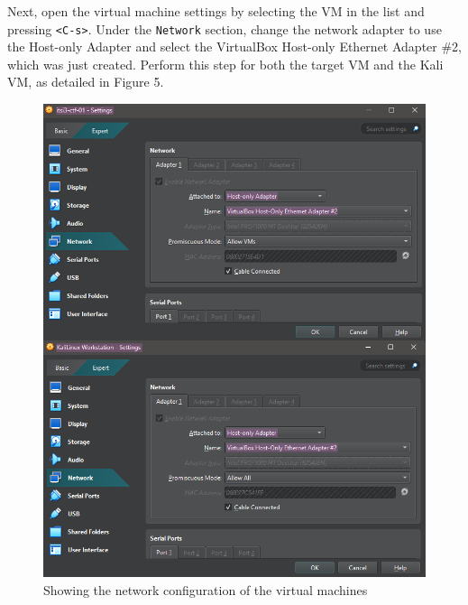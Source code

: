 \documentclass[a4paper]{article}
\newcommand{\abc}{\hfill \break}
\begin{document}
Next, open the virtual machine settings by selecting the VM in the list and pressing \texttt{<C-s>}. Under the \texttt{Network} section, change the network adapter to use the Host-only Adapter and select the VirtualBox Host-only Ethernet Adapter \#2, which was just created. Perform this step for both the target VM and the Kali VM, as detailed in Figure 5.
\newpage
\begin{figure}[ht]
	\includegraphics[scale=0.4]{./images/vmnwconf.png}
	\centering
	\caption{Showing the network configuration of the virtual machines}
\end{figure}\abc
\newpage
\end{document}
